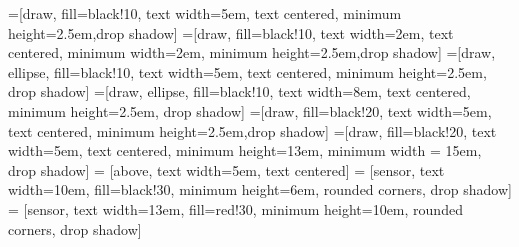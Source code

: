 \newcommand{\mx}[1]{\mathbf{\bm{#1}}} %
\newcommand{\vc}[1]{\mathbf{\bm{#1}}} %



=[draw, fill=black!10, text width=5em,
    text centered, minimum height=2.5em,drop shadow]
=[draw, fill=black!10, text width=2em,
    text centered, minimum width=2em, minimum height=2.5em,drop shadow]
=[draw, ellipse, fill=black!10, text width=5em,
    text centered, minimum height=2.5em, drop shadow]
=[draw, ellipse, fill=black!10, text width=8em,
    text centered, minimum height=2.5em, drop shadow]
=[draw, fill=black!20, text width=5em,
    text centered, minimum height=2.5em,drop shadow]
=[draw, fill=black!20, text width=5em,
    text centered, minimum height=13em, minimum width = 15em, drop shadow]
 = [above, text width=5em, text centered]
 = [sensor, text width=10em, fill=black!30,
    minimum height=6em, rounded corners, drop shadow]
 = [sensor, text width=13em, fill=red!30,
    minimum height=10em, rounded corners, drop shadow]


\def\blockdist{1.5}
\def\edgedist{2.5}

